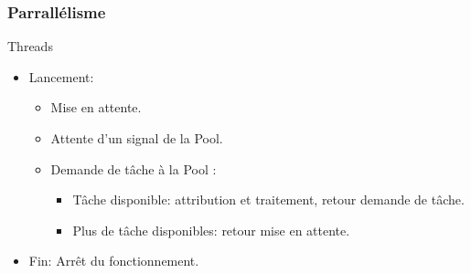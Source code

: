 \documentclass{beamer}
\begin{document}
\begin{frame}
\frametitle{Parrallélisme}
\begin{block} {Threads}
	\begin{itemize}
		\item Lancement: 
			\begin{itemize}
				\item Mise en attente.
				\item Attente d'un signal de la Pool.
				\item Demande de tâche à la Pool :	
					\begin{itemize}
						\item Tâche disponible: attribution et traitement, retour demande de tâche.
						\item Plus de tâche disponibles: retour mise en attente.								\end{itemize}
			\end{itemize}
		\item Fin: Arrêt du fonctionnement. 
	\end{itemize}
\end{block} 

\end{frame}
\end{document}
